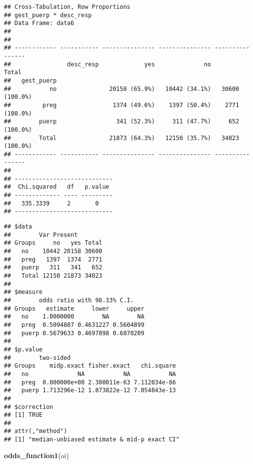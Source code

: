 \documentclass[
]{article}
\newenvironment{Shaded}{\begin{snugshade}}{\end{snugshade}}
\newcommand{\KeywordTok}[1]{\textcolor[rgb]{0.13,0.29,0.53}{\textbf{#1}}}
\newcommand{\NormalTok}[1]{#1}
\newcommand{\OperatorTok}[1]{\textcolor[rgb]{0.81,0.36,0.00}{\textbf{#1}}}
\newcommand{\StringTok}[1]{\textcolor[rgb]{0.31,0.60,0.02}{#1}}
\begin{document}
\begin{verbatim}
## Cross-Tabulation, Row Proportions  
## gest_puerp * desc_resp  
## Data Frame: data6  
## 
## 
## ------------ ----------- --------------- --------------- ----------------
##                desc_resp             yes              no            Total
##   gest_puerp                                                             
##           no               20158 (65.9%)   10442 (34.1%)   30600 (100.0%)
##         preg                1374 (49.6%)    1397 (50.4%)    2771 (100.0%)
##        puerp                 341 (52.3%)     311 (47.7%)     652 (100.0%)
##        Total               21873 (64.3%)   12150 (35.7%)   34023 (100.0%)
## ------------ ----------- --------------- --------------- ----------------
## 
## ----------------------------
##  Chi.squared   df   p.value 
## ------------- ---- ---------
##   335.3339     2       0    
## ----------------------------
\end{verbatim}

\begin{Shaded}
\end{Shaded}

\begin{verbatim}
## $data
##        Var Present
## Groups     no   yes Total
##   no    10442 20158 30600
##   preg   1397  1374  2771
##   puerp   311   341   652
##   Total 12150 21873 34023
## 
## $measure
##        odds ratio with 98.33% C.I.
## Groups   estimate     lower     upper
##   no    1.0000000        NA        NA
##   preg  0.5094807 0.4631227 0.5604899
##   puerp 0.5679633 0.4697898 0.6870209
## 
## $p.value
##        two-sided
## Groups    midp.exact fisher.exact   chi.square
##   no              NA           NA           NA
##   preg  0.000000e+00 2.380011e-63 7.112034e-66
##   puerp 1.713296e-12 1.873822e-12 7.054843e-13
## 
## $correction
## [1] TRUE
## 
## attr(,"method")
## [1] "median-unbiased estimate & mid-p exact CI"
\end{verbatim}

\begin{Shaded}
\begin{Highlighting}[]
\KeywordTok{odds_function1}\NormalTok{(oi)}
\end{Highlighting}
\end{Shaded}
\end{document}
